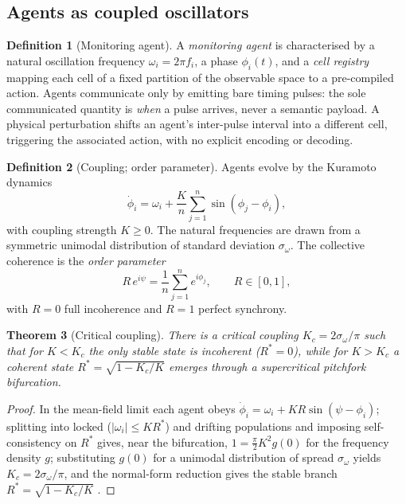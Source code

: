 \documentclass[11pt,twocolumn,a4paper]{article}
\theoremstyle{thmstyle}
\newtheorem{theorem}{Theorem}[section]
\theoremstyle{definition}
\newtheorem{definition}[theorem]{Definition}
\theoremstyle{remark}
\newcommand{\Rens}{R}
\begin{document}
\subsection{Agents as coupled oscillators}

\begin{definition}[Monitoring agent]
\label{def:agent}
A \emph{monitoring agent} is characterised by a natural oscillation
frequency $\omega_i=2\pi f_i$, a phase $\phi_i(t)$, and a
\emph{cell registry} mapping each cell of a fixed partition of the
observable space to a pre-compiled action. Agents communicate only by
emitting bare timing pulses: the sole communicated quantity is \emph{when}
a pulse arrives, never a semantic payload. A physical perturbation shifts
an agent's inter-pulse interval into a different cell, triggering the
associated action, with no explicit encoding or decoding.
\end{definition}

\begin{definition}[Coupling; order parameter]
\label{def:kuramoto}
Agents evolve by the Kuramoto dynamics
\citep{kuramoto1984chemical,strogatz2000kuramoto}
\[
\dot\phi_i=\omega_i+\frac{K}{n}\sum_{j=1}^{n}\sin(\phi_j-\phi_i),
\]
with coupling strength $K\ge0$. The natural frequencies are drawn from a
symmetric unimodal distribution of standard deviation $\sigma_\omega$. The
collective coherence is the \emph{order parameter}
\[
\Rens\,e^{i\psi}=\frac1n\sum_{j=1}^{n}e^{i\phi_j},\qquad \Rens\in[0,1],
\]
with $\Rens=0$ full incoherence and $\Rens=1$ perfect synchrony.
\end{definition}

\begin{theorem}[Critical coupling]
\label{thm:critical}
There is a critical coupling $K_c=2\sigma_\omega/\pi$ such that for $K<K_c$
the only stable state is incoherent ($\Rens^\ast=0$), while for $K>K_c$ a
coherent state $\Rens^\ast=\sqrt{1-K_c/K}$ emerges through a supercritical
pitchfork bifurcation.
\end{theorem}

\begin{proof}
In the mean-field limit each agent obeys
$\dot\phi_i=\omega_i+K\Rens\sin(\psi-\phi_i)$; splitting into locked
($|\omega_i|\le K\Rens^\ast$) and drifting populations and imposing
self-consistency on $\Rens^\ast$ gives, near the bifurcation,
$1=\tfrac{\pi}{2}K^2 g(0)$ for the frequency density $g$; substituting
$g(0)$ for a unimodal distribution of spread $\sigma_\omega$ yields
$K_c=2\sigma_\omega/\pi$, and the normal-form reduction gives the stable
branch $\Rens^\ast=\sqrt{1-K_c/K}$
\citep{strogatz2000kuramoto,pikovsky2001synchronization}.
\end{proof}
\end{document}
